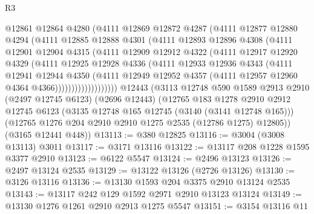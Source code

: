 \begin{lexlean}{R3}
\begin{coremodule}
                  @12861
                  @12864
                  @4280
                  (@4111
                    @12869
                    @12872
                    @4287
                    (@4111
                      @12877
                      @12880
                      @4294
                      (@4111
                        @12885
                        @12888
                        @4301
                        (@4111
                          @12893
                          @12896
                          @4308
                          (@4111
                            @12901
                            @12904
                            @4315
                            (@4111
                              @12909
                              @12912
                              @4322
                              (@4111
                                @12917
                                @12920
                                @4329
                                (@4111
                                  @12925
                                  @12928
                                  @4336
                                  (@4111
                                    @12933
                                    @12936
                                    @4343
                                    (@4111
                                      @12941
                                      @12944
                                      @4350
                                      (@4111
                                        @12949
                                        @12952
                                        @4357
                                        (@4111 @12957 @12960 @4364 @4366)))))))))))))))))))
    @12443
    (@3113
      @12748
      @590
      @1589
      @2913
      @2910
      (@2497 @12745 @6123)
      (@2696 @12443)
      (@12765
        @183
        @1278
        @2910
        @2912
        @12745
        @6123
        (@3135 @12748 @165 @12745 (@3140 (@3141 @12748 @165)))
        (@12765 @1276 @204 @2910 @2910 @1275 @2535 (@12786 @1275) @12805))
      (@3165 @12441 @448))
@13113 := @380 @12825
@13116 := @3004 (@3008 @13113) @3011
@13117 := @3171 @13116
@13122 := @13117 @208 @1228 @1595 @3377 @2910
@13123 := @6122 @5547
@13124 := @2496 @13123
@13126 := @2497 @13124 @2535
@13129 := @13122 @13126 (@2726 @13126)
@13130 := @3126 @13116
@13136 := @13130 @1593 @204 @3375 @2910 @13124 @2535
@13143 := @13117 @242 @129 @1592 @2971 @2910 @13123 @13124
@13149 := @13130 @1276 @1261 @2910 @2913 @1275 @5547
@13151 := @3154 @13116 @11

\end{coremodule}
\end{lexlean}

